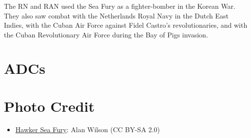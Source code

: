 The RN and RAN used the Sea Fury as a fighter-bomber in the Korean War. They also saw combat with the Netherlands Royal Navy in the Dutch East Indies, with the Cuban Air Force against Fidel Castro's revolutionaries, and with the Cuban Revolutionary Air Force during the Bay of Pigs invasion.

\section{ADCs}

\begin{adclist}
\end{adclist}

\section{Photo Credit}
\begin{itemize}\raggedright
    \item \href{https://commons.wikimedia.org/wiki/File:Hawker_Fury_FB.11_‘SR661’_(G-CBEL)_(35902999510).jpg}{Hawker Sea Fury}: Alan Wilson (CC BY-SA 2.0)
\end{itemize}
